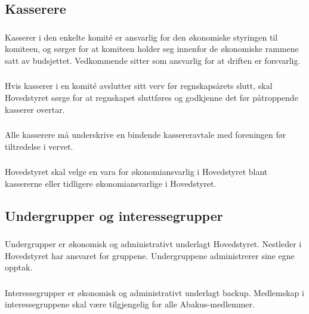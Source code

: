 \subsection{Kasserere}

\subsubsection{}
Kasserer i den enkelte komité er ansvarlig for den økonomiske styringen til
komiteen, og sørger for at komiteen holder seg innenfor de økonomiske rammene satt av budsjettet.
Vedkommende sitter som ansvarlig for at driften er forsvarlig.

\subsubsection{}
Hvis kasserer i en komité avslutter sitt verv før regnskapsårets slutt, skal Hovedstyret sørge for at regnskapet sluttføres og godkjenne det før påtroppende kasserer overtar.

\subsubsection{}
Alle kasserere må underskrive en bindende kassereravtale med foreningen før tiltredelse i vervet.

\subsubsection{}
Hovedstyret skal velge en vara for økonomiansvarlig i Hovedstyret blant kassererne eller tidligere økonomiansvarlige i Hovedstyret.

\subsection{Undergrupper og interessegrupper}

\subsubsection{}
Undergrupper er økonomisk og administrativt underlagt Hovedstyret. Nestleder i
Hovedstyret har ansvaret for gruppene. Undergruppene administrerer sine egne
opptak.

\subsubsection{}
Interessegrupper er økonomisk og administrativt underlagt backup. Medlemskap i
interessegruppene skal være tilgjengelig for alle Abakus-medlemmer.

